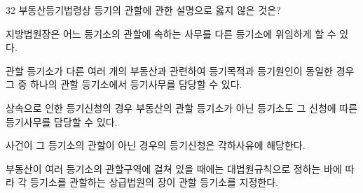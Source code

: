 \begin{question}{32}
부동산등기법령상 등기의 관할에 관한 설명으로 옳지 않은 것은?
\begin{choices}
  \item 지방법원장은 어느 등기소의 관할에 속하는 사무를 다른 등기소에 위임하게 할 수 있다.
  \item 관할 등기소가 다른 여러 개의 부동산과 관련하여 등기목적과 등기원인이 동일한 경우 그 중 하나의 관할 등기소에서 등기사무를 담당할 수 있다.
  \item 상속으로 인한 등기신청의 경우 부동산의 관할 등기소가 아닌 등기소도 그 신청에 따른 등기사무를 담당할 수 있다.
  \item 사건이 그 등기소의 관할이 아닌 경우의 등기신청은 각하사유에 해당한다.
  \item 부동산이 여러 등기소의 관할구역에 걸쳐 있을 때에는 대법원규칙으로 정하는 바에 따라 각 등기소를 관할하는 상급법원의 장이 관할 등기소를 지정한다.
\end{choices}
\end{question}

